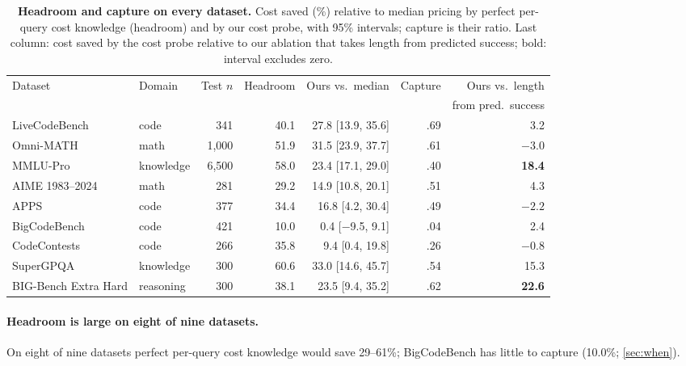 \documentclass[10pt]{article}
\begin{document}
\begin{table}[t]
\centering
\footnotesize
\setlength{\tabcolsep}{3.3pt}
\begin{tabular}{llrrrrr}
\toprule
Dataset & Domain & Test $n$ & Headroom & Ours vs.\ median & Capture & Ours vs.\ length \\
 & & & & & & from pred.\ success \\
\midrule
LiveCodeBench & code & 341 & 40.1 & 27.8 [13.9, 35.6] & .69 & 3.2 \\
Omni-MATH & math & 1,000 & 51.9 & 31.5 [23.9, 37.7] & .61 & $-3.0$ \\
MMLU-Pro & knowledge & 6,500 & 58.0 & 23.4 [17.1, 29.0] & .40 & \textbf{18.4} \\
AIME 1983--2024 & math & 281 & 29.2 & 14.9 [10.8, 20.1] & .51 & 4.3 \\
APPS & code & 377 & 34.4 & 16.8 [4.2, 30.4] & .49 & $-2.2$ \\
BigCodeBench & code & 421 & 10.0 & 0.4 [$-$9.5, 9.1] & .04 & 2.4 \\
CodeContests & code & 266 & 35.8 & 9.4 [0.4, 19.8] & .26 & $-0.8$ \\
SuperGPQA & knowledge & 300 & 60.6 & 33.0 [14.6, 45.7] & .54 & 15.3 \\
BIG-Bench Extra Hard & reasoning & 300 & 38.1 & 23.5 [9.4, 35.2] & .62 & \textbf{22.6} \\
\bottomrule
\end{tabular}
\caption{\textbf{Headroom and capture on every dataset.} Cost saved (\%) relative to median pricing by perfect per-query cost knowledge (headroom) and by our cost probe, with 95\% intervals; capture is their ratio. Last column: cost saved by the cost probe relative to our ablation that takes length from predicted success; bold: interval excludes zero.}
\label{tab:pools}
\end{table}

\paragraph{Headroom is large on eight of nine datasets.}
On eight of nine datasets perfect per-query cost knowledge would save 29--61\%; BigCodeBench has little to capture (10.0\%; \cref{sec:when}).
\end{document}
